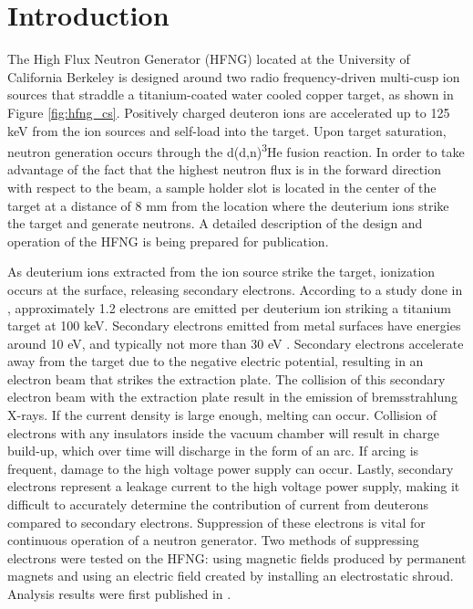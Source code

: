 \documentclass[aps,prstab,twocolumn,superscriptaddress]{revtex4-1}
\begin{document}
\pacs{}

\maketitle

\section{Introduction}
The High Flux Neutron Generator (HFNG) located at the University of California Berkeley is designed around two radio frequency-driven multi-cusp ion sources that straddle a titanium-coated water cooled copper target, as shown in Figure \ref{fig:hfng_cs}. Positively charged deuteron ions are accelerated up to 125 keV from the ion sources and self-load into the target. Upon target saturation, neutron generation occurs through the d(d,n)\textsuperscript{3}He fusion reaction. In order to take advantage of the fact that the highest neutron flux is in the forward direction with respect to the beam, a sample holder slot is located in the center of the target at a distance of 8 mm from the location where the deuterium ions strike the target and generate neutrons. A detailed description of the design and operation of the HFNG is being prepared for publication.

As deuterium ions extracted from the ion source strike the target, ionization occurs at the surface, releasing secondary electrons. According to a study done in \cite{Electron_emission}, approximately 1.2 electrons are emitted per deuterium ion striking a titanium target at 100 keV. Secondary electrons emitted from metal surfaces have energies around 10 eV, and typically not more than 30 eV \cite{SE_energy}. Secondary electrons accelerate away from the target due to the negative electric potential, resulting in an electron beam that strikes the extraction plate. The collision of this secondary electron beam with the extraction plate result in the emission of bremsstrahlung X-rays. If the current density is large enough, melting can occur. Collision of electrons with any insulators inside the vacuum chamber will result in charge build-up, which over time will discharge in the form of an arc. If arcing is frequent, damage to the high voltage power supply can occur. Lastly, secondary electrons represent a leakage current to the high voltage power supply, making it difficult to accurately determine the contribution of current from deuterons compared to secondary electrons. Suppression of these electrons is vital for continuous operation of a neutron generator. Two methods of suppressing electrons were tested on the HFNG: using magnetic fields produced by permanent magnets and using an electric field created by installing an electrostatic shroud. Analysis results were first published in \cite{waltzPHD}.
\end{document}
